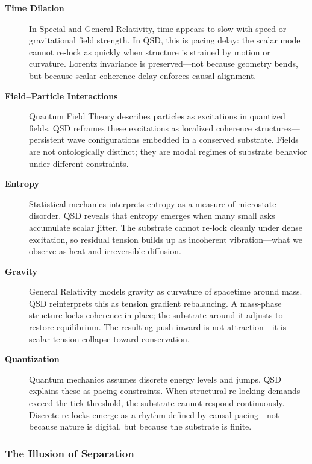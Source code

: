 \documentclass[entropy,article,submit,pdftex,moreauthors]{Definitions/mdpi}
\begin{document}
\vspace{0.5em}
\begin{description}
  \item[\textbf{Time Dilation}]  
  In Special and General Relativity, time appears to slow with speed or gravitational field strength. In QSD, this is pacing delay: the scalar mode cannot re-lock as quickly when structure is strained by motion or curvature. Lorentz invariance is preserved—not because geometry bends, but because scalar coherence delay enforces causal alignment.

  \item[\textbf{Field–Particle Interactions}]  
  Quantum Field Theory describes particles as excitations in quantized fields. QSD reframes these excitations as localized coherence structures—persistent wave configurations embedded in a conserved substrate. Fields are not ontologically distinct; they are modal regimes of substrate behavior under different constraints.

  \item[\textbf{Entropy}]  
  Statistical mechanics interprets entropy as a measure of microstate disorder. QSD reveals that entropy emerges when many small asks accumulate scalar jitter. The substrate cannot re-lock cleanly under dense excitation, so residual tension builds up as incoherent vibration—what we observe as heat and irreversible diffusion.

  \item[\textbf{Gravity}]  
  General Relativity models gravity as curvature of spacetime around mass. QSD reinterprets this as tension gradient rebalancing. A mass-phase structure locks coherence in place; the substrate around it adjusts to restore equilibrium. The resulting push inward is not attraction—it is scalar tension collapse toward conservation.

  \item[\textbf{Quantization}]  
  Quantum mechanics assumes discrete energy levels and jumps. QSD explains these as pacing constraints. When structural re-locking demands exceed the tick threshold, the substrate cannot respond continuously. Discrete re-locks emerge as a rhythm defined by causal pacing—not because nature is digital, but because the substrate is finite.
\end{description}

\subsubsection*{The Illusion of Separation}
\end{document}
